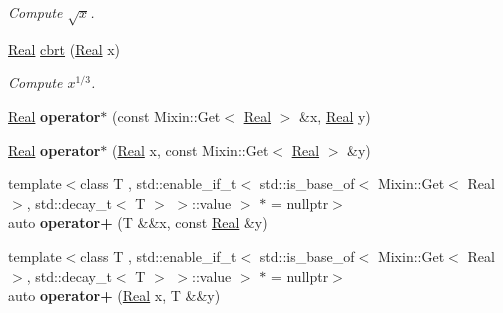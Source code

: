 \begin{DoxyCompactItemize}
\begin{DoxyCompactList}\small\item\em \-Compute $\sqrt{x}$. \end{DoxyCompactList}\item 
\hypertarget{namespaceSpacy_a64093cc47f73b71ba92bc0dd37e9572b}{\hyperlink{classSpacy_1_1Real}{\-Real} \hyperlink{namespaceSpacy_a64093cc47f73b71ba92bc0dd37e9572b}{cbrt} (\hyperlink{classSpacy_1_1Real}{\-Real} x)}\label{namespaceSpacy_a64093cc47f73b71ba92bc0dd37e9572b}

\begin{DoxyCompactList}\small\item\em \-Compute $ x^{1/3} $. \end{DoxyCompactList}\item 
\hypertarget{namespaceSpacy_a2408a53b27498ddeb762c52b51b71905}{\hyperlink{classSpacy_1_1Real}{\-Real} {\bfseries operator$\ast$} (const \-Mixin\-::\-Get$<$ \hyperlink{classSpacy_1_1Real}{\-Real} $>$ \&x, \hyperlink{classSpacy_1_1Real}{\-Real} y)}\label{namespaceSpacy_a2408a53b27498ddeb762c52b51b71905}

\item 
\hypertarget{namespaceSpacy_af0d849d3130fd1252cf3a58b4f194e6b}{\hyperlink{classSpacy_1_1Real}{\-Real} {\bfseries operator$\ast$} (\hyperlink{classSpacy_1_1Real}{\-Real} x, const \-Mixin\-::\-Get$<$ \hyperlink{classSpacy_1_1Real}{\-Real} $>$ \&y)}\label{namespaceSpacy_af0d849d3130fd1252cf3a58b4f194e6b}

\item 
\hypertarget{namespaceSpacy_a00adbd58a88f8474c28da323effbcc26}{{\footnotesize template$<$class T , std\-::enable\-\_\-if\-\_\-t$<$ std\-::is\-\_\-base\-\_\-of$<$ Mixin\-::\-Get$<$ Real $>$, std\-::decay\-\_\-t$<$ T $>$ $>$\-::value $>$ $\ast$  = nullptr$>$ }\\auto {\bfseries operator+} (\-T \&\&x, const \hyperlink{classSpacy_1_1Real}{\-Real} \&y)}\label{namespaceSpacy_a00adbd58a88f8474c28da323effbcc26}

\item 
\hypertarget{namespaceSpacy_af24641d6a51293d3601c760ec310a1b1}{{\footnotesize template$<$class T , std\-::enable\-\_\-if\-\_\-t$<$ std\-::is\-\_\-base\-\_\-of$<$ Mixin\-::\-Get$<$ Real $>$, std\-::decay\-\_\-t$<$ T $>$ $>$\-::value $>$ $\ast$  = nullptr$>$ }\\auto {\bfseries operator+} (\hyperlink{classSpacy_1_1Real}{\-Real} x, \-T \&\&y)}\label{namespaceSpacy_af24641d6a51293d3601c760ec310a1b1}


\end{DoxyCompactItemize}
